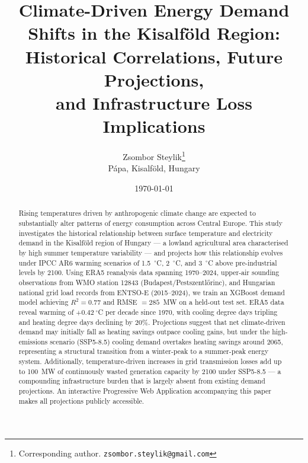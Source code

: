 \documentclass[11pt,a4paper]{article}
\begin{document}
\title{Climate-Driven Energy Demand Shifts in the Kisalf\"{o}ld Region:\\
Historical Correlations, Future Projections,\\
and Infrastructure Loss Implications}

\author{
  Zsombor Steylik\thanks{Corresponding author. \texttt{zsombor.steylik@gmail.com}}\\
  \small P\'{a}pa, Kisalf\"{o}ld, Hungary
}

\date{\today}

\maketitle

\begin{abstract}
Rising temperatures driven by anthropogenic climate change are expected to
substantially alter patterns of energy consumption across Central Europe.
This study investigates the historical relationship between surface temperature
and electricity demand in the Kisalf\"{o}ld region of Hungary --- a lowland
agricultural area characterised by high summer temperature variability ---
and projects how this relationship evolves under IPCC AR6 warming scenarios
of 1.5~$^\circ$C, 2~$^\circ$C, and 3~$^\circ$C above pre-industrial levels
by 2100. Using ERA5 reanalysis data spanning 1970--2024, upper-air sounding
observations from WMO station 12843 (Budapest/Pestszentl\H{o}rinc), and
Hungarian national grid load records from ENTSO-E (2015--2024), we train an
XGBoost demand model achieving $R^2 = 0.77$ and RMSE $= 285$~MW on a
held-out test set. ERA5 data reveal warming of $+0.42~^\circ$C per decade
since 1970, with cooling degree days tripling and heating degree days
declining by 20\%. Projections suggest that net climate-driven demand may
initially fall as heating savings outpace cooling gains, but under the
high-emissions scenario (SSP5-8.5) cooling demand overtakes heating savings
around 2065, representing a structural transition from a winter-peak to a
summer-peak energy system. Additionally, temperature-driven increases in
grid transmission losses add up to 100~MW of continuously wasted generation
capacity by 2100 under SSP5-8.5 --- a compounding infrastructure burden
that is largely absent from existing demand projections. An interactive
Progressive Web Application accompanying this paper makes all projections
publicly accessible.
\end{abstract}
\end{document}
